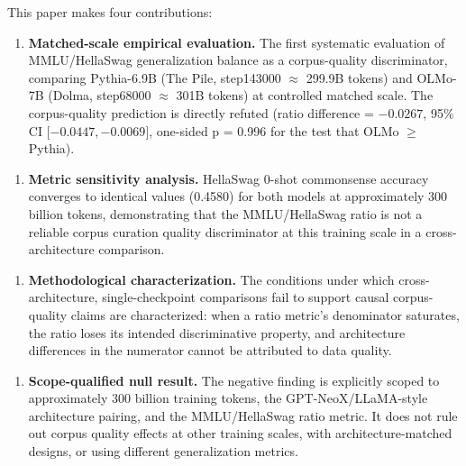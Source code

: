 This paper makes four contributions:

\begin{enumerate}
\item \textbf{Matched-scale empirical evaluation.} The first systematic evaluation of MMLU/HellaSwag generalization balance as a corpus-quality discriminator, comparing Pythia-6.9B (The Pile, step143000 $\approx$ 299.9B tokens) and OLMo-7B (Dolma, step68000 $\approx$ 301B tokens) at controlled matched scale. The corpus-quality prediction is directly refuted (ratio difference = $-0.0267$, 95\% CI [$-0.0447, -0.0069]$, one-sided p = 0.996 for the test that OLMo $\geq$ Pythia).
\end{enumerate}

\begin{enumerate}
\item \textbf{Metric sensitivity analysis.} HellaSwag 0-shot commonsense accuracy converges to identical values (0.4580) for both models at approximately 300 billion tokens, demonstrating that the MMLU/HellaSwag ratio is not a reliable corpus curation quality discriminator at this training scale in a cross-architecture comparison.
\end{enumerate}

\begin{enumerate}
\item \textbf{Methodological characterization.} The conditions under which cross-architecture, single-checkpoint comparisons fail to support causal corpus-quality claims are characterized: when a ratio metric's denominator saturates, the ratio loses its intended discriminative property, and architecture differences in the numerator cannot be attributed to data quality.
\end{enumerate}

\begin{enumerate}
\item \textbf{Scope-qualified null result.} The negative finding is explicitly scoped to approximately 300 billion training tokens, the GPT-NeoX/LLaMA-style architecture pairing, and the MMLU/HellaSwag ratio metric. It does not rule out corpus quality effects at other training scales, with architecture-matched designs, or using different generalization metrics.
\end{enumerate}

